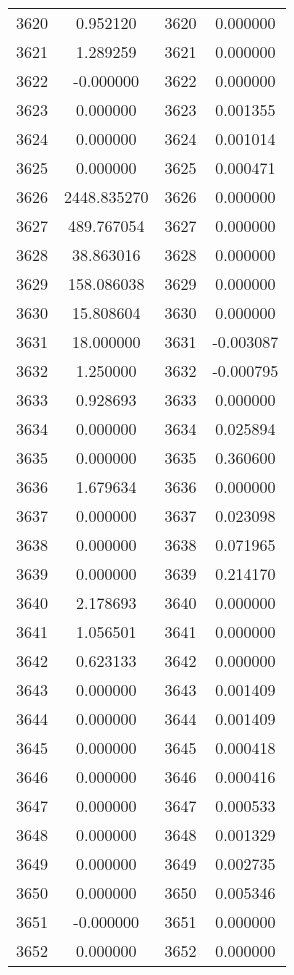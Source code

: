 \documentclass[12pt]{article}
\begin{document}
\begin{longtable}{@{}cccc@{}}
3620 & 0.952120 & 3620 & 0.000000 \\
3621 & 1.289259 & 3621 & 0.000000 \\
3622 & -0.000000 & 3622 & 0.000000 \\
3623 & 0.000000 & 3623 & 0.001355 \\
3624 & 0.000000 & 3624 & 0.001014 \\
3625 & 0.000000 & 3625 & 0.000471 \\
3626 & 2448.835270 & 3626 & 0.000000 \\
3627 & 489.767054 & 3627 & 0.000000 \\
3628 & 38.863016 & 3628 & 0.000000 \\
3629 & 158.086038 & 3629 & 0.000000 \\
3630 & 15.808604 & 3630 & 0.000000 \\
3631 & 18.000000 & 3631 & -0.003087 \\
3632 & 1.250000 & 3632 & -0.000795 \\
3633 & 0.928693 & 3633 & 0.000000 \\
3634 & 0.000000 & 3634 & 0.025894 \\
3635 & 0.000000 & 3635 & 0.360600 \\
3636 & 1.679634 & 3636 & 0.000000 \\
3637 & 0.000000 & 3637 & 0.023098 \\
3638 & 0.000000 & 3638 & 0.071965 \\
3639 & 0.000000 & 3639 & 0.214170 \\
3640 & 2.178693 & 3640 & 0.000000 \\
3641 & 1.056501 & 3641 & 0.000000 \\
3642 & 0.623133 & 3642 & 0.000000 \\
3643 & 0.000000 & 3643 & 0.001409 \\
3644 & 0.000000 & 3644 & 0.001409 \\
3645 & 0.000000 & 3645 & 0.000418 \\
3646 & 0.000000 & 3646 & 0.000416 \\
3647 & 0.000000 & 3647 & 0.000533 \\
3648 & 0.000000 & 3648 & 0.001329 \\
3649 & 0.000000 & 3649 & 0.002735 \\
3650 & 0.000000 & 3650 & 0.005346 \\
3651 & -0.000000 & 3651 & 0.000000 \\
3652 & 0.000000 & 3652 & 0.000000 \\

\end{longtable}
\end{document}
